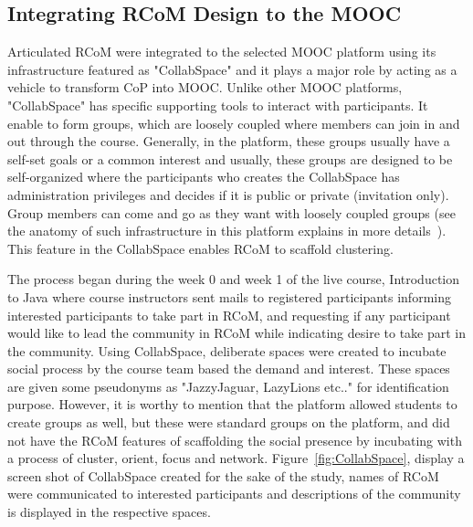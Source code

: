 \documentclass[format=acmsmall, review=false, screen=true]{acmart}
\begin{document}
\subsection{Integrating RCoM Design to the MOOC}

Articulated RCoM were integrated to the selected MOOC platform using its infrastructure featured as "CollabSpace" and it plays a major role by acting as a vehicle to transform CoP into MOOC. Unlike other MOOC platforms, "CollabSpace" has specific supporting tools to interact with participants. It enable to form groups, which are loosely coupled where members can join in and out through the course. Generally, in the platform, these groups usually have a self-set goals or a common interest and usually, these groups are designed to be self-organized where the participants who creates the CollabSpace has administration privileges and decides if it is public or private (invitation only). Group members can come and go as they want with loosely coupled groups (see the anatomy of such infrastructure in this platform explains in more details~\cite{staubitz2014supporting,staubitz2017collaboration}). This feature in the CollabSpace enables RCoM to scaffold clustering. 

The process began during the week 0 and week 1 of the live course, Introduction to Java where course instructors sent mails to registered participants informing interested participants to take part in RCoM, and requesting if any participant would like to lead the community in RCoM while indicating desire to take part in the community. Using CollabSpace, deliberate spaces were created to incubate social process by the course team based the demand and interest. These spaces are given some pseudonyms as "JazzyJaguar, LazyLions etc.." for identification purpose. However, it is worthy to mention that the platform allowed students to create groups as well, but these were standard groups on the platform, and did not have the RCoM features of scaffolding the social presence by incubating with a process of cluster, orient, focus and network. Figure~\ref{fig:CollabSpace}, display a screen shot of CollabSpace created for the sake of the study, names of RCoM were communicated to interested participants and descriptions of the community is displayed in the respective spaces. 
\end{document}
